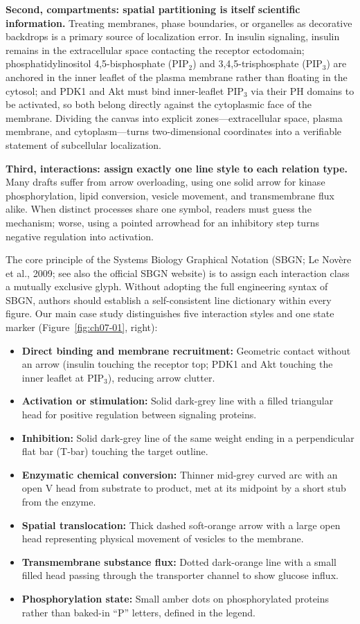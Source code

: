 \textbf{Second, compartments: spatial partitioning is itself scientific information.} Treating membranes, phase boundaries, or organelles as decorative backdrops is a primary source of localization error. In insulin signaling, insulin remains in the extracellular space contacting the receptor ectodomain; phosphatidylinositol 4,5-bisphosphate ($\text{PIP}_2$) and 3,4,5-trisphosphate ($\text{PIP}_3$) are anchored in the inner leaflet of the plasma membrane rather than floating in the cytosol; and PDK1 and Akt must bind inner-leaflet $\text{PIP}_3$ via their PH domains to be activated, so both belong directly against the cytoplasmic face of the membrane. Dividing the canvas into explicit zones---extracellular space, plasma membrane, and cytoplasm---turns two-dimensional coordinates into a verifiable statement of subcellular localization.

\textbf{Third, interactions: assign exactly one line style to each relation type.} Many drafts suffer from arrow overloading, using one solid arrow for kinase phosphorylation, lipid conversion, vesicle movement, and transmembrane flux alike. When distinct processes share one symbol, readers must guess the mechanism; worse, using a pointed arrowhead for an inhibitory step turns negative regulation into activation.

The core principle of the Systems Biology Graphical Notation (SBGN; Le Nov\`ere et al., 2009; see also the official SBGN website) is to assign each interaction class a mutually exclusive glyph. Without adopting the full engineering syntax of SBGN, authors should establish a self-consistent line dictionary within every figure. Our main case study distinguishes five interaction styles and one state marker (Figure~\ref{fig:ch07-01}, right):
\begin{itemize}
\item \textbf{Direct binding and membrane recruitment:} Geometric contact without an arrow (insulin touching the receptor top; PDK1 and Akt touching the inner leaflet at $\text{PIP}_3$), reducing arrow clutter.
\item \textbf{Activation or stimulation:} Solid dark-grey line with a filled triangular head for positive regulation between signaling proteins.
\item \textbf{Inhibition:} Solid dark-grey line of the same weight ending in a perpendicular flat bar (T-bar) touching the target outline.
\item \textbf{Enzymatic chemical conversion:} Thinner mid-grey curved arc with an open V head from substrate to product, met at its midpoint by a short stub from the enzyme.
\item \textbf{Spatial translocation:} Thick dashed soft-orange arrow with a large open head representing physical movement of vesicles to the membrane.
\item \textbf{Transmembrane substance flux:} Dotted dark-orange line with a small filled head passing through the transporter channel to show glucose influx.
\item \textbf{Phosphorylation state:} Small amber dots on phosphorylated proteins rather than baked-in ``P'' letters, defined in the legend.
\end{itemize}

